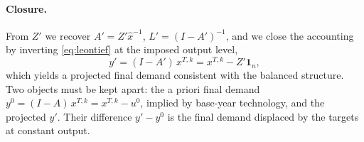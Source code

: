 \documentclass[11pt,a4paper]{article}
\begin{document}

\paragraph{Closure.}
From $Z'$ we recover $A' = Z' \hat{x}^{-1}$, $L' = (I - A')^{-1}$, and we
close the accounting by inverting \eqref{eq:leontief} at the imposed output level,
\begin{equation}\label{eq:closure}
  y' = (I - A') \, x^{T,k} = x^{T,k} - Z' \mathbf{1}_n ,
\end{equation}
which yields a projected final demand consistent with the balanced structure. Two objects must be kept apart: the a priori final demand $y^0 = (I - A)\,x^{T,k} = x^{T,k} - u^0$, implied by base-year technology, and the projected $y'$. Their difference $y' - y^0$ is the final demand displaced by the targets at constant output.
\end{document}
